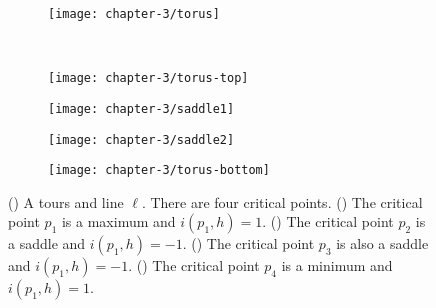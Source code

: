  \begin{figure}[htb]
         \centering
        \begin{subfigure}[b]{0.3\textwidth}
         \texttt{[image: chapter-3/torus]}
 	 \label{fig:torus-ell}
       \end{subfigure}\\
         \begin{subfigure}[b]{0.21\textwidth}
         \texttt{[image: chapter-3/torus-top]}
          \label{fig:max}
         \end{subfigure}
          \begin{subfigure}[b]{0.21\textwidth}
         \texttt{[image: chapter-3/saddle1]}
          \label{fig:saddle1}
         \end{subfigure}
         \begin{subfigure}[b]{0.21\textwidth}
         \texttt{[image: chapter-3/saddle2]}
          \label{fig:saddle2}
         \end{subfigure}
         \begin{subfigure}[b]{0.21\textwidth}
         \texttt{[image: chapter-3/torus-bottom]}
         \label{fig:min}
         \end{subfigure}
		\caption{() A tours and line $\ell$. There are four critical points.
 		() The critical point $p_1$ is a maximum and $i(p_1,h)=1$.
		() The critical point $p_2$ is a saddle and $i(p_1,h)=-1$.
		() The critical point $p_3$ is also a saddle and $i(p_1,h)=-1$.
		() The critical point $p_4$ is a minimum and $i(p_1,h)=1$.
 		\label{fig:torus-total}}
 \end{figure}


